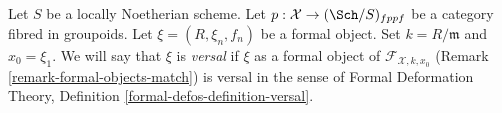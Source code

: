 \begin{definition}
\label{definition-versal-formal-object}
Let $S$ be a locally Noetherian scheme. Let
$p : \mathcal{X} \to (\Sch/S)_{fppf}$ be a category fibred in groupoids.
Let $\xi = (R, \xi_n, f_n)$ be a formal object. Set $k = R/\mathfrak m$ and
$x_0 = \xi_1$. We will say that $\xi$ is {\it versal} if $\xi$
as a formal object of $\mathcal{F}_{\mathcal{X}, k, x_0}$
(Remark \ref{remark-formal-objects-match}) is versal in the sense
of Formal Deformation Theory, Definition \ref{formal-defos-definition-versal}.
\end{definition}